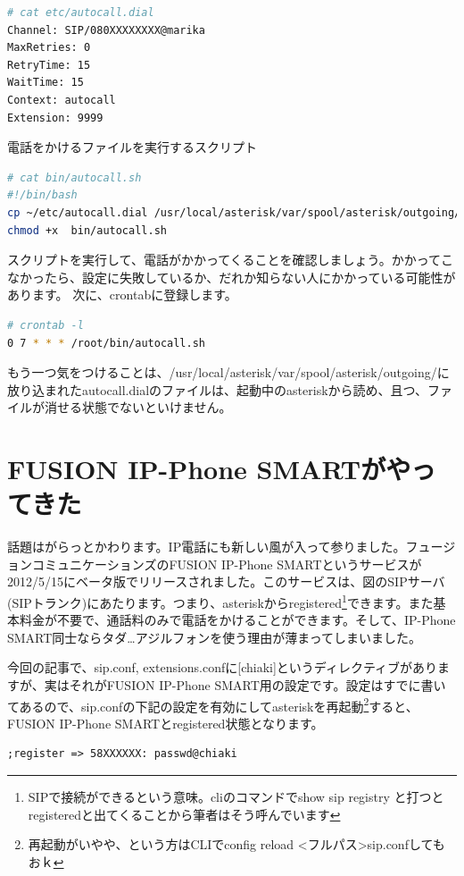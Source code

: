 \begin{lstlisting}[language=bash]
# cat etc/autocall.dial 
Channel: SIP/080XXXXXXXX@marika
MaxRetries: 0
RetryTime: 15
WaitTime: 15
Context: autocall
Extension: 9999
\end{lstlisting}

電話をかけるファイルを実行するスクリプト

\begin{lstlisting}[language=bash]
# cat bin/autocall.sh 
#!/bin/bash
cp ~/etc/autocall.dial /usr/local/asterisk/var/spool/asterisk/outgoing/
chmod +x  bin/autocall.sh 
\end{lstlisting}
スクリプトを実行して、電話がかかってくることを確認しましょう。かかってこなかったら、設定に失敗しているか、だれか知らない人にかかっている可能性があります。
次に、crontabに登録します。
\begin{lstlisting}[language=bash]
# crontab -l 
0 7 * * * /root/bin/autocall.sh
\end{lstlisting}

もう一つ気をつけることは、/usr/local/asterisk/var/spool/asterisk/outgoing/に放り込まれたautocall.dialのファイルは、起動中のasteriskから読め、且つ、ファイルが消せる状態でないといけません。

\section{FUSION IP-Phone SMARTがやってきた}
話題はがらっとかわります。IP電話にも新しい風が入って参りました。フュージョンコミュニケーションズのFUSION IP-Phone SMARTというサービスが2012/5/15にベータ版でリリースされました。このサービスは、図のSIPサーバ(SIPトランク)にあたります。つまり、asteriskからregistered\footnote{SIPで接続ができるという意味。cliのコマンドでshow sip registry と打つとregisteredと出てくることから筆者はそう呼んでいます}できます。また基本料金が不要で、通話料のみで電話をかけることができます。そして、IP-Phone SMART同士ならタダ…アジルフォンを使う理由が薄まってしまいました。

今回の記事で、sip.conf, extensions.confに[chiaki]というディレクティブがありますが、実はそれがFUSION IP-Phone SMART用の設定です。設定はすでに書いてあるので、sip.confの下記の設定を有効にしてasteriskを再起動\footnote{再起動がいやや、という方はCLIでconfig reload <フルパス>sip.confしてもおｋ}すると、FUSION IP-Phone SMARTとregistered状態となります。

\begin{lstlisting}
;register => 58XXXXXX: passwd@chiaki
\end{lstlisting}


